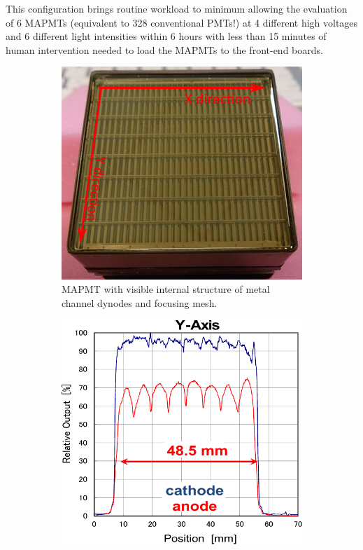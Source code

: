This configuration brings routine workload to minimum allowing the evaluation of 6 MAPMTs (equivalent to 328 conventional PMTs!) at 4 different high voltages and 6 different light intensities within 6 hours with less than 15 minutes of human intervention needed to load the MAPMTs to the front-end boards.

\begin{figure}[b]
	\centering
	\begin{subfigure}{0.3\linewidth}
		\includegraphics[width=\linewidth]{figures/surfaceuniform1.pdf}
		\caption{MAPMT with visible internal structure of metal channel dynodes and focusing mesh.}
		\label{fig:surfaceuniform1}
	\end{subfigure}
	\quad
	\begin{subfigure}{0.3\linewidth}
		\includegraphics[width=\linewidth]{figures/surfaceuniform3.pdf}

\end{subfigure}
\end{figure}
